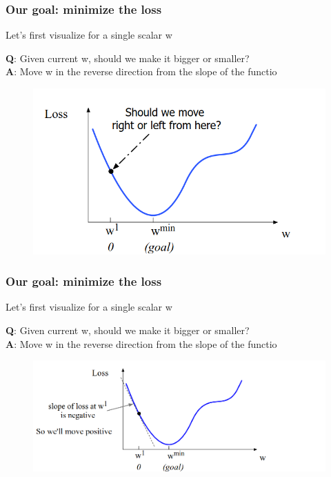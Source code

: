 \documentclass[13.5pt,aspecratio=169]{beamer}
\begin{document}
\begin{frame}
\onehalfspacing
	\frametitle{Our goal: minimize the loss}
	{\Large Let's first visualize for a single scalar w}
	\begin{block}{}
		\textbf{Q}: Given current w, should we make it bigger or smaller? \\
        \textbf{A}: Move w in the reverse direction from the slope of the functio
	\end{block}
	\bigskip
        \begin{figure}
            \centering
            \includegraphics [scale=0.45] {visualize_0.png}
            
            \label{fig:enter-label}
        \end{figure}
	
\end{frame}


\begin{frame}
    \onehalfspacing
        \frametitle{Our goal: minimize the loss}
        {\Large Let's first visualize for a single scalar w}
        \begin{block}{}
            \textbf{Q}: Given current w, should we make it bigger or smaller? \\
            \textbf{A}: Move w in the reverse direction from the slope of the functio
        \end{block}
        \bigskip
            \begin{figure}
                \centering
                \includegraphics [scale=0.45] {visualize_1.png}
                
            \end{figure}
        
    \end{frame}
\end{document}
